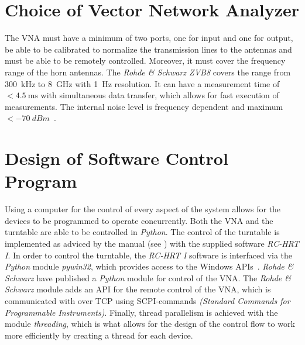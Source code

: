 
\section{Choice of Vector Network Analyzer}
The VNA must have a minimum of two ports, one for input and one for output, be able to be calibrated to normalize the transmission lines to the antennas and must be able to be remotely controlled. Moreover, it must cover the frequency range of the horn antennas. The \textit{Rohde \& Schwarz ZVB8} covers the range from \SI{300}{\kilo\hertz} to \SI{8}{\giga\hertz} with \SI{1}{\hertz} resolution. It can have a measurement time of $<\SI{4.5}{\milli\second}$ with simultaneous data transfer, which allows for fast execution of measurements. The internal noise level is frequency dependent and maximum $<-\SI{70}{dBm}$~\cite[p. 14]{vna_data_sheet_spec}.



\section{Design of Software Control Program}
Using a computer for the control of every aspect of the system allows for the devices to be programmed to operate concurrently. Both the VNA and the turntable are able to be controlled in \textit{Python}. The control of the turntable is implemented as adviced by the manual (see \cite{hrt_i_manual}) with the supplied software \textit{RC-HRT I}. In order to control the turntable, the \textit{RC-HRT I} software is interfaced via the \textit{Python} module \textit{pywin32}, which provides access to the Windows APIs~\cite{pywin32}. \textit{Rohde \& Schwarz} have published a \textit{Python} module for control of the VNA. The \textit{Rohde \& Schwarz} module adds an API for the remote control of the VNA, which is communicated with over TCP using SCPI-commands \textit{(Standard Commands for Programmable Instruments)}. Finally, thread parallelism is achieved with the module \textit{threading}, which is what allows for the design of the control flow to work more efficiently by creating a thread for each device.




